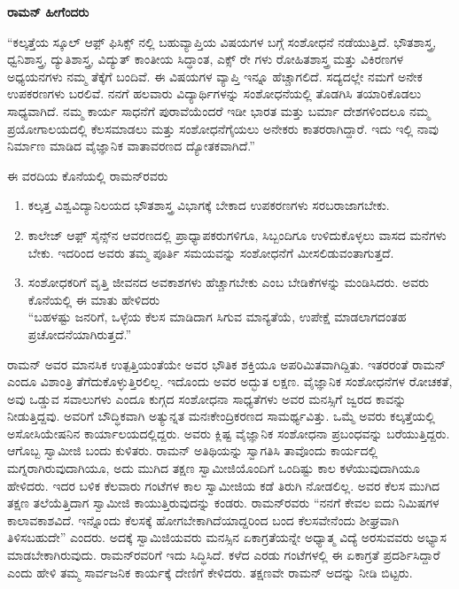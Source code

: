 \vskip 2pt

\textbf{ರಾಮನ್ ಹೀಗೆಂದರು\general{\enginline{--}}}

\vskip 2pt

“ಕಲ್ಕತ್ತೆಯ ಸ್ಕೂಲ್ ಆಫ಼್ ಫಿಸಿಕ್ಸ್ ನಲ್ಲಿ ಬಹುವ್ಯಾಪ್ತಿಯ ವಿಷಯಗಳ ಬಗ್ಗೆ ಸಂಶೋಧನೆ ನಡೆಯುತ್ತಿದೆ. ಭೌತಶಾಸ್ತ್ರ, ಧ್ವನಿಶಾಸ್ತ್ರ, ದ್ಯುತಿಶಾಸ್ತ್ರ, ವಿದ್ಯುತ್ ಕಾಂತೀಯ ಸಿದ್ಧಾಂತ, ಎಕ್ಸ್ ರೇ ಗಳು ರೋಹಿತಶಾಸ್ತ್ರ ಮತ್ತು ವಿಕಿರಣಗಳ ಅಧ್ಯಯನಗಳು ನಮ್ಮ ತೆಕ್ಕೆಗೆ ಬಂದಿವೆ. ಈ ವಿಷಯಗಳ ವ್ಯಾಪ್ತಿ ಇನ್ನೂ ಹೆಚ್ಚಾಗಲಿದೆ. ಸದ್ಯದಲ್ಲೇ ನಮಗೆ ಅನೇಕ ಉಪಕರಣಗಳು ಬರಲಿವೆ. ನನಗೆ ಹಲವಾರು ವಿದ್ಯಾರ್ಥಿಗಳನ್ನು ಸಂಶೋಧನೆಯಲ್ಲಿ ತೊಡಗಿಸಿ ತಯಾರಿಕೊಡಲು ಸಾಧ್ಯವಾಗಿದೆ. ನಮ್ಮ ಕಾರ್ಯ ಸಾಧನೆಗೆ ಪುರಾವೆಯೆಂದರೆ ಇಡೀ ಭಾರತ ಮತ್ತು ಬರ್ಮಾ ದೇಶಗಳಿಂದಲೂ ನಮ್ಮ ಪ್ರಯೋಗಾಲಯದಲ್ಲಿ ಕೆಲಸಮಾಡಲು ಮತ್ತು ಸಂಶೋಧನೆಗೈಯಲು ಅನೇಕರು ಕಾತರರಾಗಿದ್ದಾರೆ. ಇದು ಇಲ್ಲಿ ನಾವು ನಿರ್ಮಾಣ ಮಾಡಿದ ವೈಜ್ಞಾನಿಕ ವಾತಾವರಣದ ದ್ಯೋತಕವಾಗಿದೆ.”

\vskip 3pt

ಈ ವರದಿಯ ಕೊನೆಯಲ್ಲಿ ರಾಮನ್‍ರವರು

\begin{enumerate}
\item ಕಲ್ಕತ್ತ ವಿಶ್ವವಿದ್ಯಾನಿಲಯದ ಭೌತಶಾಸ್ತ್ರ ವಿಭಾಗಕ್ಕೆ ಬೇಕಾದ ಉಪಕರಣಗಳು ಸರಬರಾಜಾಗ\-ಬೇಕು. 

 \item ಕಾಲೇಜ್ ಆಫ಼್ ಸೈನ್ಸ್‌ನ ಆವರಣದಲ್ಲಿ ಪ್ರಾಧ್ಯಾಪಕರುಗಳಿಗೂ, ಸಿಬ್ಬಂದಿಗೂ ಉಳಿದುಕೊಳ್ಳಲು ವಾಸದ ಮನೆಗಳು ಬೇಕು. ಇದರಿಂದ ಅವರು ತಮ್ಮ ಪೂರ್ತಿ ಸಮಯವನ್ನು ಸಂಶೋಧನೆಗೆ ಮೀಸಲಿಡುವಂತಾಗುತ್ತದೆ.

 \item ಸಂಶೋಧಕರಿಗೆ ವೃತ್ತಿ ಜೀವನದ ಅವಕಾಶಗಳು ಹೆಚ್ಚಾಗಬೇಕು ಎಂಬ ಬೇಡಿಕೆಗಳನ್ನು ಮಂಡಿಸಿ\-ದರು. ಅವರು ಕೊನೆಯಲ್ಲಿ ಈ ಮಾತು ಹೇಳಿದರು\enginline{--} \\“ಬಹಳಷ್ಟು ಜನರಿಗೆ, ಒಳ್ಳೆಯ ಕೆಲಸ ಮಾಡಿದಾಗ ಸಿಗುವ ಮಾನ್ಯತೆಯೆ, ಉಪೇಕ್ಷೆ ಮಾಡಲಾಗದಂತಹ ಪ್ರಚೋದನೆಯಾಗಿರುತ್ತದೆ.”

\end{enumerate}

\vskip 3pt

ರಾಮನ್ ಅವರ ಮಾನಸಿಕ ಉತ್ಪತ್ತಿಯಂತೆಯೇ ಅವರ ಭೌತಿಕ ಶಕ್ತಿಯೂ ಅಪರಿಮಿತವಾಗಿದ್ದಿತು. ಇತರರಂತೆ ರಾಮನ್ ಎಂದೂ ವಿಶಾಂತ್ರಿ ತೆಗೆದುಕೊಳ್ಳುತ್ತಿರಲಿಲ್ಲ. ಇದೊಂದು ಅವರ ಅದ್ಭುತ ಲಕ್ಷಣ. ವೈಜ್ಞಾನಿಕ ಸಂಶೋಧನೆಗಳ ರೋಚಕತೆ, ಅವು ಒಡ್ಡುವ ಸವಾಲುಗಳು ಎಂದೂ ಕುಗ್ಗದ ಸಂಶೋಧನಾ ಸಾಧ್ಯತೆಗಳು ಅವರ ಮನಸ್ಸಿಗೆ ಜ್ವರದ ಕಾವನ್ನು ನೀಡುತ್ತಿದ್ದವು. ಅವರಿಗೆ ಬೌದ್ಧಿಕವಾಗಿ ಅತ್ಯುನ್ನತ ಮನಃಕೇಂದ್ರಿಕರಣದ ಸಾಮರ್ಥ್ಯವಿತ್ತು. ಒಮ್ಮೆ ಅವರು ಕಲ್ಕತ್ತೆಯಲ್ಲಿ ಅಸೋಸಿಯೇಷನಿನ ಕಾರ್ಯಾಲಯದಲ್ಲಿದ್ದರು. ಅವರು ಕ್ಲಿಷ್ಟ ವೈಜ್ಞಾನಿಕ ಸಂಶೋಧನಾ ಪ್ರಬಂಧವನ್ನು ಬರೆಯುತ್ತಿದ್ದರು. ಆಗೊಬ್ಬ ಸ್ವಾಮೀಜಿ ಬಂದು ಕುಳಿತರು. ರಾಮನ್ ಅತಿಥಿಯನ್ನು ಸ್ವಾಗತಿಸಿ ತಾವೊಂದು ಕಾರ್ಯದಲ್ಲಿ ಮಗ್ನರಾಗಿರುವುದಾಗಿಯೂ, ಅದು ಮುಗಿದ ತಕ್ಷಣ ಸ್ವಾಮೀಜಿಯೊಂದಿಗೆ ಒಂದಿಷ್ಟು ಕಾಲ ಕಳೆಯುವು\-ದಾಗಿಯೂ ಹೇಳಿದರು. ಇದರ ಬಳಿಕ ಕೆಲವಾರು ಗಂಟೆಗಳ ಕಾಲ ಸ್ವಾಮೀಜಿಯ ಕಡೆ ತಿರುಗಿ ನೋಡಲಿಲ್ಲ. ಅವರ ಕೆಲಸ ಮುಗಿದ ತಕ್ಷಣ ತಲೆಯೆತ್ತಿದಾಗ ಸ್ವಾಮೀಜಿ ಕಾಯುತ್ತಿರುವುದನ್ನು ಕಂಡರು. ರಾಮನ್‍ರವರು “ನನಗೆ ಕೇವಲ ಐದು ನಿಮಿಷಗಳ ಕಾಲಾವಕಾಶವಿದೆ. ಇನ್ನೊಂದು ಕೆಲಸಕ್ಕೆ ಹೋಗಬೇಕಾಗಿದೆಯಾದ್ದರಿಂದ ಬಂದ ಕೆಲಸವೇನೆಂದು ಶೀಘ್ರವಾಗಿ ತಿಳಿಸಬಹುದೇ” ಎಂದರು. ಅದಕ್ಕೆ ಸ್ವಾಮಿಜಿಯವರು ಮನಸ್ಸಿನ ಏಕಾಗ್ರತೆಯನ್ನೇ ಅಧ್ಯಾತ್ಮ ವಿದ್ಯೆ ಅರಸುವವರು ಅಭ್ಯಾಸ ಮಾಡಬೇಕಾಗಿರುವುದು. ರಾಮನ್‍ರವರಿಗೆ ಇದು ಸಿದ್ಧಿಸಿದೆ. ಕಳೆದ ಎರಡು ಗಂಟೆಗಳಲ್ಲಿ ಈ ಏಕಾಗ್ರತೆ ಪ್ರದರ್ಶಿಸಿದ್ದಾರೆ ಎಂದು ಹೇಳಿ ತಮ್ಮ ಸಾರ್ವಜನಿಕ ಕಾರ್ಯಕ್ಕೆ ದೇಣಿಗೆ ಕೇಳಿದರು. ತಕ್ಷಣವೇ ರಾಮನ್ ಅದನ್ನು ನೀಡಿ ಬಿಟ್ಟರು.

